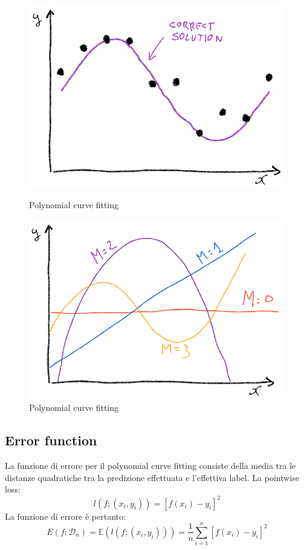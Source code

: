 	\begin{figure}
		\centering
		\begin{minipage}{.5\textwidth}
			\centering
			\includegraphics[width=1\linewidth]{imgs/chapter2/img9}
			\caption{Polynomial curve fitting}
			\label{fig:chapter02-09}
		\end{minipage}%
		\begin{minipage}{.5\textwidth}
			\centering
			\includegraphics[width=1\linewidth]{imgs/chapter2/img10}
			\caption{Polynomial curve fitting}
			\label{fig:chapter02-10}
		\end{minipage}
	\end{figure}



	\subsection{Error function}
	La funzione di errore per il polynomial curve fitting consiste della media tra le distanze quadratiche tra la predizione effettuata e l'effettiva label.
	La pointwise loss:
	$$l(f;(x_i,y_i)) = [f(x_i) - y_i]^2$$
	La funzione di errore \`e pertanto:
	$$E(f;\mathcal{D}_n) = \mathbb{E}(l(f;(x_i,y_i))) = \frac{1}{n}\sum\limits_{i=1}^n[f(x_i)-y_i]^2$$

